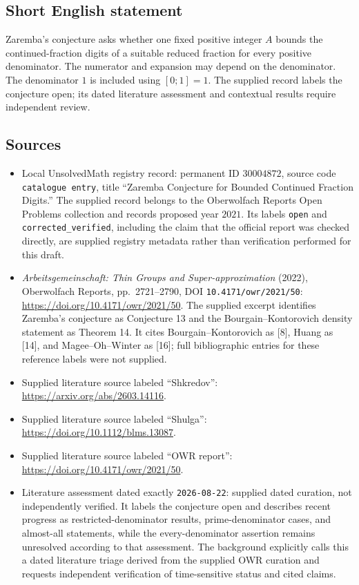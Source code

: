 \documentclass[11pt]{article}
\begin{document}
\subsection{Short English statement}
Zaremba's conjecture asks whether one fixed positive integer \(A\) bounds the continued-fraction digits of a suitable reduced fraction for every positive denominator. The numerator and expansion may depend on the denominator. The denominator \(1\) is included using \([0;1]=1\). The supplied record labels the conjecture open; its dated literature assessment and contextual results require independent review.
\subsection{Sources}
\begin{itemize}
\item Local UnsolvedMath registry record: permanent ID \(30004872\), source code \texttt{catalogue entry}, title ``Zaremba Conjecture for Bounded Continued Fraction Digits.'' The supplied record belongs to the Oberwolfach Reports Open Problems collection and records proposed year \(2021\). Its labels \texttt{open} and \texttt{corrected\_verified}, including the claim that the official report was checked directly, are supplied registry metadata rather than verification performed for this draft.
\item \emph{Arbeitsgemeinschaft: Thin Groups and Super-approximation} (2022), Oberwolfach Reports, pp.\ 2721--2790, DOI \texttt{10.4171/owr/2021/50}: \url{https://doi.org/10.4171/owr/2021/50}. The supplied excerpt identifies Zaremba's conjecture as Conjecture 13 and the Bourgain--Kontorovich density statement as Theorem 14. It cites Bourgain--Kontorovich as [8], Huang as [14], and Magee--Oh--Winter as [16]; full bibliographic entries for these reference labels were not supplied.
\item Supplied literature source labeled ``Shkredov'': \url{https://arxiv.org/abs/2603.14116}.
\item Supplied literature source labeled ``Shulga'': \url{https://doi.org/10.1112/blms.13087}.
\item Supplied literature source labeled ``OWR report'': \url{https://doi.org/10.4171/owr/2021/50}.
\item Literature assessment dated exactly \texttt{2026-08-22}: supplied dated curation, not independently verified. It labels the conjecture open and describes recent progress as restricted-denominator results, prime-denominator cases, and almost-all statements, while the every-denominator assertion remains unresolved according to that assessment. The background explicitly calls this a dated literature triage derived from the supplied OWR curation and requests independent verification of time-sensitive status and cited claims.
\end{itemize}
\end{document}
